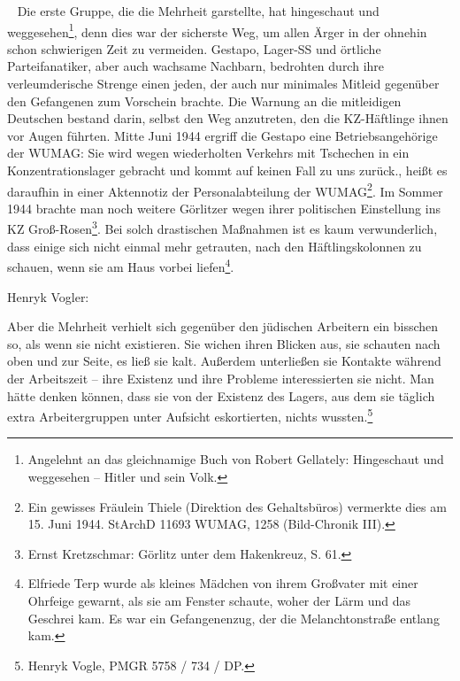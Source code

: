 ~\newline
Die erste Gruppe, die die Mehrheit garstellte, hat \glqq hingeschaut und weggesehen\grqq\footnote{Angelehnt an das gleichnamige Buch von Robert Gellately: Hingeschaut und weggesehen -- Hitler und sein Volk.}, denn dies war der sicherste Weg, um allen Ärger in der ohnehin schon schwierigen Zeit zu vermeiden. Gestapo, Lager-SS und örtliche Parteifanatiker, aber auch wachsame Nachbarn, bedrohten durch ihre verleumderische Strenge einen jeden, der auch nur minimales Mitleid gegenüber den Gefangenen zum Vorschein brachte. Die Warnung an die mitleidigen Deutschen bestand darin, selbst den Weg anzutreten, den die KZ-Häftlinge ihnen vor Augen führten. Mitte Juni 1944 ergriff die Gestapo eine Betriebsangehörige der WUMAG: \glqq Sie wird wegen wiederholten Verkehrs mit Tschechen in ein Konzentrationslager gebracht und kommt auf keinen Fall zu uns zurück.\grqq, heißt es daraufhin in einer Aktennotiz der Personalabteilung der WUMAG\footnote{Ein gewisses Fräulein Thiele (Direktion des Gehaltsbüros) vermerkte dies am 15. Juni 1944. StArchD 11693 WUMAG, 1258 (Bild-Chronik III).}. Im Sommer 1944 brachte man noch weitere Görlitzer wegen ihrer politischen Einstellung ins KZ Groß-Rosen\footnote{Ernst Kretzschmar: Görlitz unter dem Hakenkreuz, S. 61.}. Bei solch drastischen Maßnahmen ist es kaum verwunderlich, dass einige sich nicht einmal mehr getrauten, nach den Häftlingskolonnen zu schauen, wenn sie am Haus vorbei liefen\footnote{Elfriede Terp wurde als kleines Mädchen von ihrem Großvater mit einer Ohrfeige gewarnt, als sie am Fenster schaute, woher der Lärm und das Geschrei kam. Es war ein Gefangenenzug, der die Melanchtonstraße entlang kam.}.

Henryk Vogler:

\begin{leftbar}
Aber die Mehrheit verhielt sich gegenüber den jüdischen Arbeitern ein bisschen so, als wenn sie nicht existieren. Sie wichen ihren Blicken aus, sie schauten nach oben und zur Seite, es ließ sie kalt. Außerdem unterließen sie Kontakte während der Arbeitszeit -- ihre Existenz und ihre Probleme interessierten sie nicht. Man hätte denken können, dass sie von der Existenz des Lagers, aus dem sie täglich extra Arbeitergruppen unter Aufsicht eskortierten, nichts wussten.\footnote{Henryk Vogle, PMGR 5758 / 734 / DP.}
\end{leftbar}


